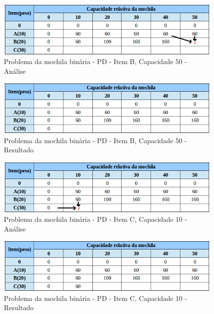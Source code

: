 \begin{itemize}
\FloatBarrier
\begin{figure}[!h]
\centering
\includegraphics[keepaspectratio=true,scale=0.6]{figuras/mochila20_50.png}
\caption{Problema da mochila binária - PD - Item B, Capacidade 50 - Análise}
\label{mochila20_50}
\end{figure}

\FloatBarrier
\begin{figure}[!h]
\centering
\includegraphics[keepaspectratio=true,scale=0.6]{figuras/mochila20_50_resp.png}
\caption{Problema da mochila binária - PD - Item B, Capacidade 50 - Resultado}
\label{mochila20_50_resp}
\end{figure}

\FloatBarrier
\begin{figure}[!h]
\centering
\includegraphics[keepaspectratio=true,scale=0.6]{figuras/mochila30_10.png}
\caption{Problema da mochila binária - PD - Item C, Capacidade 10 - Análise}
\label{mochila30_10}
\end{figure}

\FloatBarrier
\begin{figure}[!h]
\centering
\includegraphics[keepaspectratio=true,scale=0.6]{figuras/mochila30_10_resp.png}
\caption{Problema da mochila binária - PD - Item C, Capacidade 10 - Resultado}
\label{mochila30_10_resp}
\end{figure}


\end{itemize}
